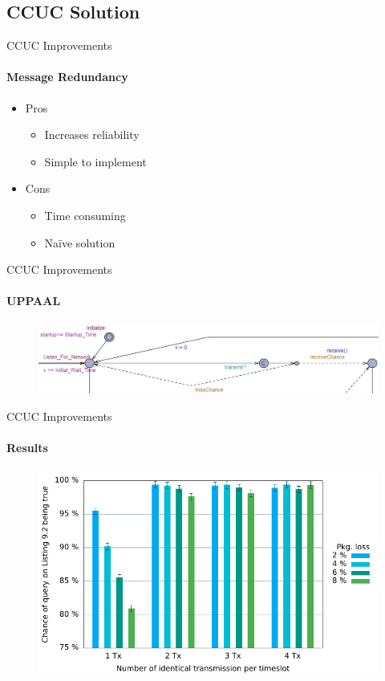 \subsection{CCUC Solution}
\begin{frame}{CCUC Improvements}
\framesubtitle{Message Redundancy}

  \begin{itemize}
    \item Pros
      \begin{itemize}
    	\item Increases reliability
    	\item Simple to implement
  	  \end{itemize}
    \item Cons
      \begin{itemize}
    	\item Time consuming
    	\item Naïve solution
  	  \end{itemize}
  \end{itemize}
\end{frame}

\begin{frame}{CCUC Improvements}
\framesubtitle{UPPAAL}
\begin{figure}%
\centering
\includegraphics[width=1\textwidth]{images/ccuc.png} 
\end{figure}	
\end{frame}

\begin{frame}{CCUC Improvements}
\framesubtitle{Results}
\begin{figure}%
\centering	
\includegraphics[width=1\textwidth]{images/graph2.pdf} 
\end{figure}
\end{frame}

